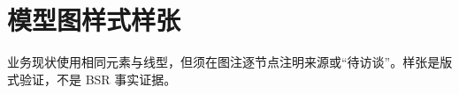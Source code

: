 \documentclass[UTF8,a4paper,11pt,fontset=windows]{ctexart}
\begin{document}
\section*{模型图样式样张}
\noindent\resizebox{\linewidth}{!}{\BSRStyleSample}
\par\medskip
\small 业务现状使用相同元素与线型，但须在图注逐节点注明来源或“待访谈”。样张是版式验证，不是 BSR 事实证据。
\end{document}
